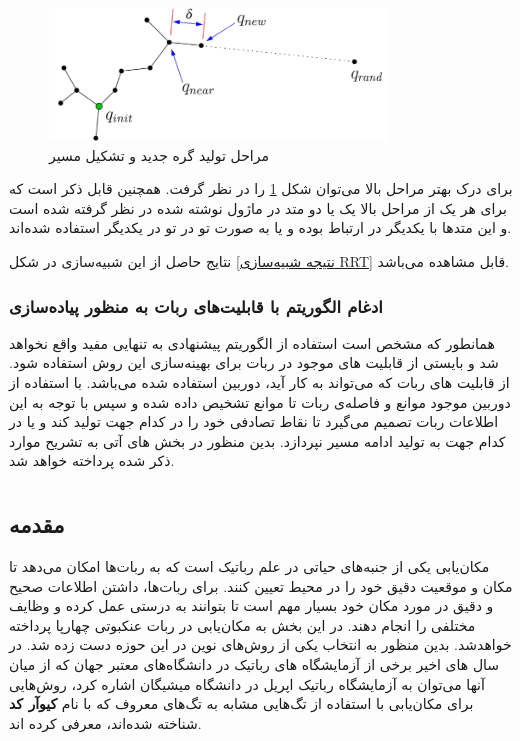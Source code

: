 \begin{figure}[H]
	\centering
	\includegraphics[width=0.8\textwidth]{./images/Chapter2/NewNodeSteps_without_background}	
	\caption[مراحل تولید گره جدید و تشکیل مسیر]{مراحل تولید گره جدید و تشکیل مسیر\cite{Algobotics}}
	\label{مراحل تولید گره جدید}
\end{figure}
\noindent
\unskip

برای درک بهتر مراحل بالا می‌توان شکل
\ref{مراحل تولید گره جدید}
را در نظر گرفت. همچنین قابل ذکر است که برای هر یک از مراحل بالا یک یا دو متد
\noindent\unskip{}
در ماژول نوشته شده در نظر گرفته شده است و این متد‌ها با یکدیگر در ارتباط بوده و یا به صورت تو در تو
\noindent\unskip{}
در یکدیگر استفاده شده‌اند. 

نتایج حاصل از این شبیه‌سازی در شکل
\ref{نتیجه شبیه‌سازی RRT}
قابل مشاهده می‌باشد.
\subsubsection{ادغام الگوریتم با قابلیت‌های ربات به منظور پیاده‌سازی}
همانطور که مشخص است استفاده از الگوریتم پیشنهادی به تنهایی مفید واقع نخواهد شد و بایستی از قابلیت های موجود در ربات برای بهینه‌سازی این روش استفاده شود. از قابلیت های ربات که می‌تواند به کار آید، دوربین استفاده شده می‌باشد. با استفاده از دوربین موجود موانع و فاصله‌ی ربات تا موانع تشخیص داده شده و سپس با توجه به این اطلاعات ربات تصمیم می‌گیرد تا نقاط تصادفی خود را در کدام جهت تولید کند و یا در کدام جهت به تولید ادامه مسیر نپردازد. بدین منظور در بخش های آتی به تشریح موارد ذکر شده پرداخته خواهد شد.

\newpage
\section{}

\subsection{مقدمه}

مکان‌یابی یکی از جنبه‌های حیاتی در علم رباتیک است که به ربات‌ها امکان می‌دهد تا مکان و موقعیت دقیق خود را در محیط تعیین کنند. برای ربات‌ها، داشتن اطلاعات صحیح و دقیق در مورد مکان خود بسیار مهم است تا بتوانند به درستی عمل کرده و وظایف مختلفی را انجام دهند. در این بخش به مکان‌یابی در ربات عنکبوتی چهارپا پرداخته خواهد‌شد. بدین منظور به انتخاب یکی از روش‌‌‌های نوین در این حوزه دست زده شد. در سال های اخیر برخی از آزمایشگاه های رباتیک در دانشگاه‌‌‌های معتبر جهان که از میان آنها می‌توان به آزمایشگاه رباتیک اپریل
\noindent\unskip{}
در دانشگاه میشیگان اشاره کرد، روش‌هایی برای مکان‌یابی با استفاده از تگ‌هایی مشابه به تگ‌های معروف که با نام 
\textbf{کیوآر کد}
\noindent\unskip{}
شناخته شده‌اند، معرفی کرده اند.

